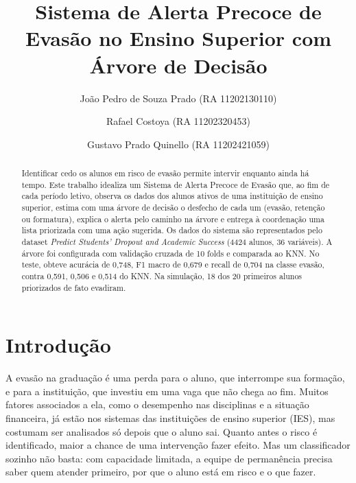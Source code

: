 \documentclass[runningheads]{llncs}
\begin{document}
%
\title{Sistema de Alerta Precoce de Evasão no Ensino Superior com Árvore de Decisão}
%
%
\author{João Pedro de Souza Prado (RA 11202130110) \and
Rafael Costoya (RA 11202320453) \and
Gustavo Prado Quinello (RA 11202421059)}
%
%
%
\maketitle
\setcounter{footnote}{0} %
%
\begin{abstract}
Identificar cedo os alunos em risco de evasão permite intervir enquanto ainda há
tempo. Este trabalho idealiza um Sistema de Alerta Precoce de Evasão que, ao fim de cada
período letivo, observa os dados dos alunos ativos de uma instituição de ensino
superior, estima com uma árvore de decisão o desfecho de cada um (evasão, retenção ou
formatura), explica o alerta pelo caminho na árvore e entrega à coordenação uma lista
priorizada com uma ação sugerida. Os dados do sistema são representados pelo dataset
\emph{Predict Students' Dropout and Academic Success} (4424 alunos, 36 variáveis). A
árvore foi configurada com validação cruzada de 10 folds e comparada ao KNN. No teste,
obteve acurácia de 0,748, F1 macro de 0,679 e recall de 0,704 na classe evasão, contra
0,591, 0,506 e 0,514 do KNN. Na simulação, 18 dos 20 primeiros alunos priorizados de
fato evadiram.

\end{abstract}
%
\section{Introdução}

A evasão na graduação é uma perda para o aluno, que interrompe sua formação, e para a
instituição, que investiu em uma vaga que não chega ao fim. Muitos fatores associados a
ela, como o desempenho nas disciplinas e a situação financeira, já estão nos sistemas
das instituições de ensino superior (IES), mas costumam ser analisados só depois que o
aluno sai. Quanto antes o risco é identificado, maior a chance de uma intervenção fazer
efeito. Mas um classificador sozinho não basta: com capacidade limitada, a equipe de
permanência precisa saber quem atender primeiro, por que o aluno está em risco e o que
fazer.
\end{document}
